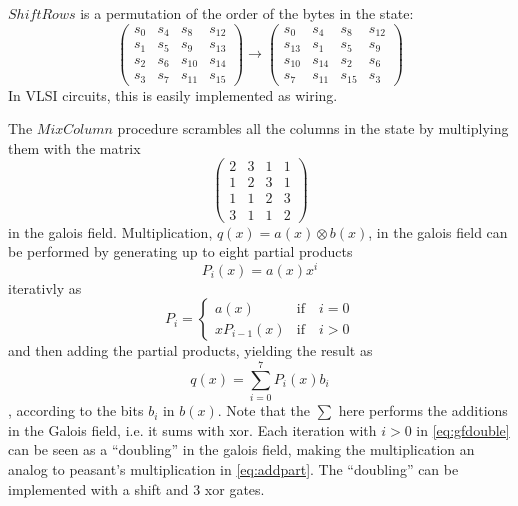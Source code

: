 $ShiftRows$ is a permutation of the order of the bytes in the state:
\begin{equation}
  \begin{pmatrix}
    s_0 & s_4 & s_8    & s_{12} \\
    s_1 & s_5 & s_9    & s_{13} \\
    s_2 & s_6 & s_{10} & s_{14} \\
    s_3 & s_7 & s_{11} & s_{15}
  \end{pmatrix} 
  \rightarrow
  \begin{pmatrix}
    s_0    & s_4    & s_8    & s_{12} \\
    s_{13} & s_1    & s_5    & s_9 \\
    s_{10} & s_{14} & s_2    & s_6 \\
    s_7    & s_{11} & s_{15} & s_3    
    \end{pmatrix}
\end{equation}
In VLSI circuits, this is easily implemented as wiring.

The $MixColumn$ procedure scrambles all the columns in the state
by multiplying them with the matrix
\begin{equation}
  \begin{pmatrix}
    2 & 3 & 1 & 1 \\
    1 & 2 & 3 & 1 \\
    1 & 1 & 2 & 3 \\
    3 & 1 & 1 & 2
  \end{pmatrix}
  \label{eq:mixcol}
\end{equation}
in the galois field. Multiplication, $q(x)=a(x) \otimes b(x)$, in the
galois field can be performed by generating up to eight partial
products
\begin{equation}
  P_i(x) = a(x) x^i
\end{equation}
iterativly as 
\begin{equation} 
  P_i = 
  \begin{cases}
    a(x) & \text{if} \quad i = 0 \\
    x P_{i-1}(x) & \text{if} \quad i > 0
  \end{cases}
  \label{eq:gfdouble}
\end{equation}
and then adding the partial products, yielding the result as
\begin{equation}
  q(x) = \sum_{i=0}^{7} P_i(x) b_i
  \label{eq:addpart}
\end{equation}
, according to the bits $b_i$ in $b(x)$. Note that the $\sum$ here
performs the additions in the Galois field, i.e. it sums with
xor. Each iteration with $i > 0$ in \eqref{eq:gfdouble} can be seen as
a ``doubling'' in the galois field, making the multiplication an
analog to peasant's multiplication in \eqref{eq:addpart}. The
``doubling'' can be implemented with a shift and 3 xor gates.

